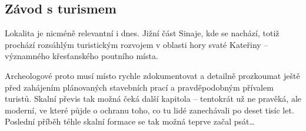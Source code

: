 \documentclass[main.tex]{subfiles}
\begin{document}
\subsection*{Závod s turismem}
Lokalita je nicméně relevantní i dnes. Jižní část Sinaje, kde se nachází, totiž prochází rozsáhlým turistickým rozvojem v oblasti hory svaté Kateřiny – významného křesťanského poutního místa.\par
Archeologové proto musí místo rychle zdokumentovat a detailně prozkoumat ještě před zahájením plánovaných stavebních prací a pravděpodobným přívalem turistů. Skalní převis tak možná čeká další kapitola – tentokrát už ne pravěká, ale moderní, ve které půjde o ochranu toho, co tu lidé zanechávali po deset tisíc let. Poslední příběh téhle skalní formace se tak možná teprve začal psát…
\newpage
\end{document}
